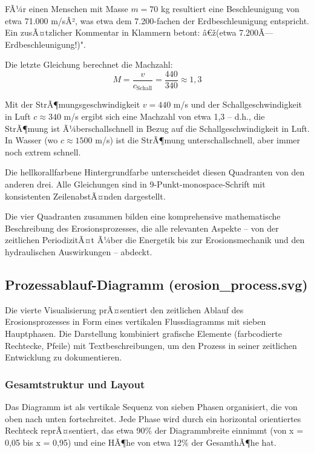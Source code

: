 FÃ¼r einen Menschen mit Masse $m = 70$ kg resultiert eine Beschleunigung von etwa 71.000 m/sÂ², was etwa dem 7.200-fachen der Erdbeschleunigung entspricht. Ein zusÃ¤tzlicher Kommentar in Klammern betont: â€ž(etwa 7.200Ã— Erdbeschleunigung!)".

Die letzte Gleichung berechnet die Machzahl:
\begin{equation*}
M = \frac{v}{c_{\mathrm{Schall}}} = \frac{440}{340} \approx 1{,}3
\end{equation*}

Mit der StrÃ¶mungsgeschwindigkeit $v = 440$ m/s und der Schallgeschwindigkeit in Luft $c \approx 340$ m/s ergibt sich eine Machzahl von etwa 1,3 -- d.h., die StrÃ¶mung ist Ã¼berschallschnell in Bezug auf die Schallgeschwindigkeit in Luft. In Wasser (wo $c \approx 1500$ m/s) ist die StrÃ¶mung unterschallschnell, aber immer noch extrem schnell.

Die hellkorallfarbene Hintergrundfarbe unterscheidet diesen Quadranten von den anderen drei. Alle Gleichungen sind in 9-Punkt-monospace-Schrift mit konsistenten ZeilenabstÃ¤nden dargestellt.

Die vier Quadranten zusammen bilden eine komprehensive mathematische Beschreibung des Erosionsprozesses, die alle relevanten Aspekte -- von der zeitlichen PeriodizitÃ¤t Ã¼ber die Energetik bis zur Erosionsmechanik und den hydraulischen Auswirkungen -- abdeckt.

\subsection{Prozessablauf-Diagramm (erosion\_process.svg)}

Die vierte Visualisierung prÃ¤sentiert den zeitlichen Ablauf des Erosionsprozesses in Form eines vertikalen Flussdiagramms mit sieben Hauptphasen. Die Darstellung kombiniert grafische Elemente (farbcodierte Rechtecke, Pfeile) mit Textbeschreibungen, um den Prozess in seiner zeitlichen Entwicklung zu dokumentieren.

\subsubsection*{Gesamtstruktur und Layout}

Das Diagramm ist als vertikale Sequenz von sieben Phasen organisiert, die von oben nach unten fortschreitet. Jede Phase wird durch ein horizontal orientiertes Rechteck reprÃ¤sentiert, das etwa 90\% der Diagrammbreite einnimmt (von x = 0,05 bis x = 0,95) und eine HÃ¶he von etwa 12\% der GesamthÃ¶he hat.

